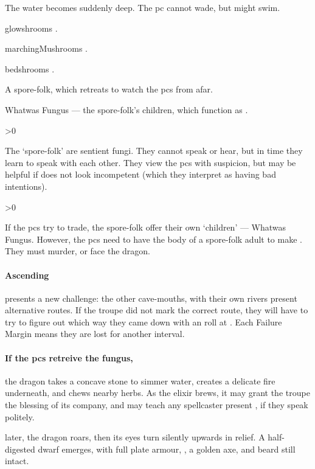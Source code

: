 \documentclass[10pt,twoside]{book}
\begin{document}
{
  \footnotesize
  \begin{dlist}
    \item
    The water becomes suddenly deep.
    The \gls{pc} cannot wade, but might swim.
    \item
    \Glspl{glowshroom} .
    \item
    \Glspl{marchingMushroom} .
    \item
    \Glspl{bedshroom} .
    \item
    A spore-folk, which retreats to watch the \glspl{pc} from afar.
    \item
    Whatwas Fungus --- the spore-folk's children, which function as .
  \end{dlist}
}

\randomize

\sporeFolk

\ifnum\value{Charisma}>0
  {\small{}}
\fi

\noindent
The `spore-folk' are sentient fungi.
They cannot speak or hear, but in time they learn to speak with each other.
They view the \glspl{pc} with suspicion, but may be helpful if  does not look incompetent (which they interpret as having bad intentions).

\sporeFolk

\ifnum\value{Charisma}>0
  {\small{}}
\fi

\wotWosFungus

\noindent
If the \glspl{pc} try to trade, the spore-folk offer their own `children' --- Whatwas Fungus.
However, the \glspl{pc} need to have the body of a spore-folk adult to make .
They must murder, or face the dragon.

\showTalisman


\paragraph{Ascending}
presents a new challenge: the other cave-mouths, with their own rivers present alternative routes.
If the troupe did not mark the correct route, they will have to try to figure out which way they came down with an  roll at \tn[10].
Each Failure Margin means they are lost for another \gls{interval}.

\paragraph{If the \glspl{pc} retreive the fungus,}
the dragon takes a concave stone to simmer water, creates a delicate fire underneath, and chews nearby herbs.
As the \gls{elixir} brews, it may grant the troupe the blessing of its company, and may teach any spellcaster present , if they speak politely.

 later, the dragon roars, then its eyes turn silently upwards in relief.
A half-digested dwarf emerges, with full plate armour, \lootBig, a golden axe, and beard still intact.
\end{document}

